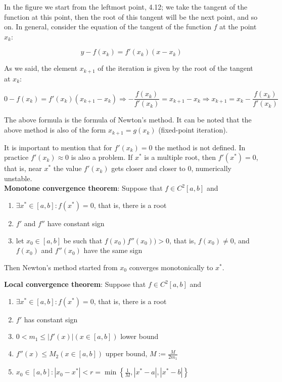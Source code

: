 \documentclass[margin=0px]{article}
\begin{document}
In the figure we start from the leftmost point, 4.12; we take the tangent of the function at this point,
then the root of this tangent will be the next point, and so on. In general,
consider the equation of the tangent of the function $f$ at the point $x_{k}$:

\begin{displaymath}
    y - f(x_{k}) = f'(x_{k}) (x-x_{k})
\end{displaymath}

\noindent As we said, the element $x_{k+1}$ of the iteration is given by the root of the tangent at $x_{k}$:

\begin{displaymath}
    0 - f(x_{k}) = f'(x_{k}) (x_{k+1}-x_{k}) \Rightarrow
    - \frac{f(x_{k})}{f'(x_{k})} = x_{k+1} - x_{k} \Rightarrow
    x_{k+1} = x_{k} - \frac{f(x_{k})}{f'(x_{k})}
\end{displaymath}

The above formula is the formula of Newton's method. It can be noted that the above method is also of the form $x_{k+1} = g(x_{k})$
(fixed-point iteration).

It is important to mention that for $f'(x_{k}) = 0$ the method is not defined. In practice $f'(x_{k}) \approx 0$ is also a problem.
If $x^{*}$ is a multiple root, then $f'(x^{*}) = 0$, that is, near $x^{*}$ the value $f'(x_{k})$ gets closer and closer to $0$, numerically
unstable.\\

\noindent \textbf{Monotone convergence theorem}: Suppose that $f \in C^{2}[a,b]$ and
\begin{enumerate}
    \item	$\exists x^{*} \in [a,b] : f(x^{*}) = 0$, that is, there is a root

    \item	$f'$ and $f''$ have constant sign

    \item	let $x_{0} \in [a,b]$ be such that $f(x_{0}) f''(x_{0})) >0$, that is, $f(x_{0}) \not = 0$, and $f(x_{0})$ and $f''(x_{0})$
          have the same sign
\end{enumerate}

\noindent Then Newton's method started from $x_{0}$ converges monotonically to $x^{*}$.

\noindent \textbf{Local convergence theorem}:	Suppose that $f \in C^{2}[a,b]$ and
\begin{enumerate}
    \item	$\exists x^{*} \in [a,b] : f(x^{*}) = 0$, that is, there is a root

    \item	$f'$ has constant sign

    \item	$0<m_{1} \leq |f'(x)| (x \in [a,b])$ lower bound

    \item	$f''(x) \leq M_{2} (x \in [a,b])$ upper bound, $M:= \frac{M}{2m_{1}}$

    \item	$x_{0} \in [a,b]: |x_{0} - x^{*}| < r = \min \left\{\frac{1}{M}, |x^{*}-a|, |x^{*}-b|\right\}$
\end{enumerate}
\end{document}
